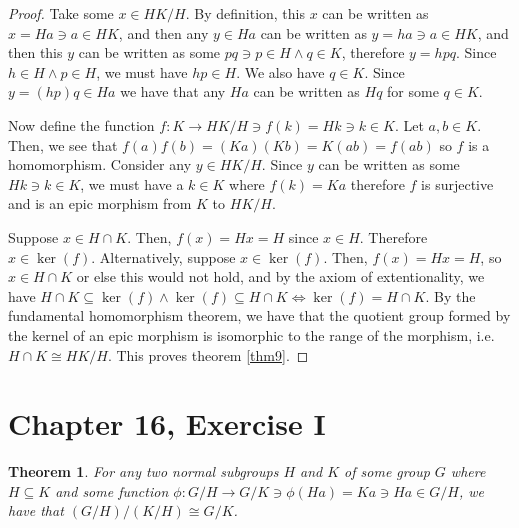 \documentclass[12pt]{article}
\newtheorem{thm}{Theorem}
\begin{document}
\begin{proof}
	Take some $x \in HK/H$.
	By definition, this $x$ can be written as $x = Ha \ni a \in HK$,
	and then any $y \in Ha$ can be written as $y = ha \ni a \in HK$,
	and then this $y$ can be written as some $pq \ni p \in H \land q \in K$,
	therefore $y = hpq$. Since $h \in H \land p \in H$, we must have $hp \in H$.
	We also have $q \in K$. Since $y = (hp)q \in Ha$ we have that any $Ha$
	can be written as $Hq$ for some $q \in K$.

	Now define the function $f:K \to HK/H \ni f(k) = Hk \ni k \in K$.
	Let $a,b \in K$. Then, we see that $f(a) f(b) = (Ka)(Kb) = K(ab) = f(ab)$
	so $f$ is a homomorphism. Consider any $y \in HK/H$.
	Since $y$ can be written as some $Hk \ni k \in K$,
	we must have a $k \in K$ where $f(k) = Ka$ therefore $f$ is surjective
	and is an epic morphism from $K$ to $HK/H$.

	Suppose $x \in H \cap K$.
	Then, $f(x) = Hx = H$ since $x \in H$.
	Therefore $x \in \ker(f)$.
	Alternatively, suppose $x \in \ker(f)$.
	Then, $f(x) = Hx = H$, so $x \in H \cap K$ or else this would not hold,
	and by the axiom of extentionality,
	we have $H \cap K \subseteq \ker(f) \land \ker(f) \subseteq H \cap K \iff \ker(f) = H \cap K$.
	By the fundamental homomorphism theorem,
	we have that the quotient group formed by
	the kernel of an epic morphism is isomorphic to the range of the morphism,
	i.e. $H \cap K \cong HK/H$.
	This proves theorem \ref{thm9}.
\end{proof}

\section{Chapter 16, Exercise I}

\begin{thm} \label{thm8}
	For any two normal subgroups $H$ and $K$ of some group $G$ where $H \subseteq K$
	and some function $\phi:G/H \to G/K \ni \phi(Ha) = Ka \ni Ha \in G/H$,
	we have that $(G/H)/(K/H) \cong G/K$.
\end{thm}
\end{document}
